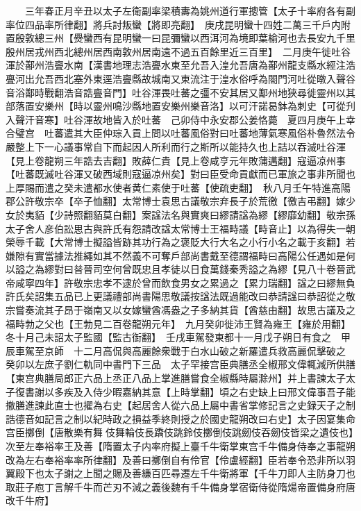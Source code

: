 　　三年春正月辛丑以太子左衛副率梁積夀為姚州道行軍摠管【太子十率府各有副率位四品率所律翻】將兵討叛蠻【將即亮翻】　庚戌昆明蠻十四姓二萬三千戶内附置殷敦總三州【㸑蠻西有昆明蠻一曰昆彌蠻以西洱河為境即葉榆河也去長安九千里殷州居戎州西北總州居西南敦州居南遠不過五百餘里近三百里】　二月庚午徙吐谷渾於鄯州浩亹水南【漢書地理志浩亹水東至允吾入湟允吾唐為鄯州龍支縣水經注浩亹河出允吾西北塞外東逕浩亹縣故城南又東流注于湟水俗呼為閤門河吐從暾入聲谷音浴鄯時戰翻浩音誥亹音門】吐谷渾畏吐蕃之彊不安其居又鄯州地狹尋徙靈州以其部落置安樂州【時以靈州鳴沙縣地置安樂州樂音洛】以可汗諾曷鉢為刺史【可從刋入聲汗音寒】吐谷渾故地皆入於吐蕃　己卯侍中永安郡公姜恪薨　夏四月庚午上幸合璧宫　吐蕃遣其大臣仲琮入貢上問以吐蕃風俗對曰吐蕃地薄氣寒風俗朴魯然法令嚴整上下一心議事常自下而起因人所利而行之斯所以能持久也上詰以吞滅吐谷渾【見上卷龍朔三年誥去吉翻】敗薛仁貴【見上卷咸亨元年敗蒲邁翻】寇逼凉州事【吐蕃既滅吐谷渾又破西域則寇逼凉州矣】對曰臣受命貢獻而已軍旅之事非所聞也上厚賜而遣之癸未遣都水使者黄仁素使于吐蕃【使疏吏翻】　秋八月壬午特進高陽郡公許敬宗卒【卒子恤翻】太常博士袁思古議敬宗弃長子於荒徼【徼吉弔翻】嫁少女於夷貊【少詩照翻貊莫白翻】案諡法名與實爽曰繆請諡為繆【繆靡幼翻】敬宗孫太子舍人彦伯訟思古與許氏有怨請改諡太常博士王福畤議【畤音止】以為得失一朝榮辱千載【大常博士擬謚皆跡其功行為之褒貶大行大名之小行小名之載于亥翻】若嫌隙有實當據法推繩如其不然義不可奪戶部尚書戴至德謂福畤曰高陽公任遇如是何以謚之為繆對曰㫺晉司空何曾既忠且孝徒以日食萬錢秦秀謚之為繆【見八十卷晉武帝咸寧四年】許敬宗忠孝不逮於曾而飲食男女之累過之【累力瑞翻】諡之曰繆無負許氏矣詔集五品已上更議禮部尚書陽思敬議按諡法既過能改曰恭請諡曰恭詔從之敬宗嘗奏流其子昂于嶺南又以女嫁蠻酋馮盎之子多納其貨【酋慈由翻】故思古議及之福畤勃之父也【王勃見二百卷龍朔元年】　九月癸卯徙沛王賢為雍王【雍於用翻】冬十月己未詔太子監國【監古衘翻】　壬戌車駕發東都十一月戊子朔日有食之　甲辰車駕至京師　十二月高侃與高麗餘衆戰于白水山破之新羅遣兵救高麗侃擊破之　癸卯以左庶子劉仁軌同中書門下三品　太子罕接宫臣典膳丞全椒邢文偉輒減所供膳【東宫典膳局郎正六品上丞正八品上掌進膳嘗食全椒縣時屬滁州】并上書諫太子太子復書謝以多疾及入侍少暇嘉納其意【上時掌翻】頃之右史缺上曰邢文偉事吾子能撤膳進諫此直士也擢為右史【起居舍人從六品上屬中書省掌修記言之史録天子之制誥德音如記言之制以紀時政之損益季終則授之於國史龍朔改曰右史】太子因宴集命宫臣擲倒【唐散樂有舞伎舞輪伎長蹻伎跳鈴伎擲倒伎跳劒伎吞劒伎皆梁之遺伎也】次至左奉裕率王及善【隋置太子内率府擬上臺千牛衛掌東宫千牛備身侍奉之事龍朔改為左右奉裕率率所律翻】及善曰擲倒自有伶官【伶盧經翻】臣若奉令恐非所以羽翼殿下也太子謝之上聞之賜及善縑百匹尋遷左千牛衛將軍【千牛刀即人主防身刀也取莊子庖丁言解千牛而芒刃不減之義後魏有千牛備身掌宿衛侍從隋煬帝置備身府唐改千牛府】

